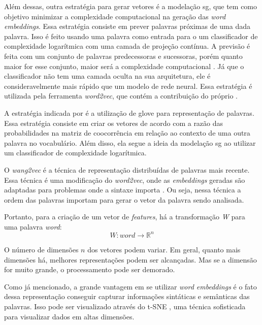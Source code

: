 Além dessas, outra estratégia para gerar vetores é a modelação \ac{sg}, que tem como objetivo minimizar a complexidade computacional na geração das \textit{word embeddings}. Essa estratégia consiste em prever palavras próximas de uma dada palavra. Isso é feito usando uma palavra como entrada para o um classificador de complexidade logarítmica com uma camada de projeção contínua. A previsão é feita com um conjunto de palavras predecessoras e sucessoras, porém quanto maior for esse conjunto, maior será a complexidade computacional \cite{mikolov2013efficient}. Já que o classificador não tem uma camada oculta na sua arquitetura, ele é consideravelmente mais rápido que um modelo de rede neural. Essa estratégia é utilizada pela ferramenta \textit{word2vec}, que contém a contribuição do próprio .

A estratégia indicada por  é a utilização de \ac{glove} para representação de palavras. Essa estratégia consiste em criar os vetores de acordo com a razão das probabilidades na matriz de coocorrência em relação ao contexto de uma outra palavra no vocabulário. Além disso, ela segue a ideia da modelação \ac{sg} ao utilizar um classificador de complexidade logarítmica. 

O \textit{wang2vec} é a técnica de representação distribuídas de palavras mais recente. Essa técnica é uma modificação do \textit{word2vec}, onde as \textit{embeddings} geradas são adaptadas para problemas onde a sintaxe importa \cite{blacktwo}. Ou seja, nessa técnica a ordem das palavras importam para gerar o vetor da palavra sendo analisada.

Portanto, para a criação de um vetor de \textit{features}, há a transformação \textit{W} para uma palavra \textit{word}:
\begin{equation}
W:word \to \mathbb{R}^n \nonumber
\end{equation}

O número de dimensões $n$ dos vetores podem variar. Em geral, quanto mais dimensões há, melhores representações podem ser alcançadas. Mas se a dimensão for muito grande, o processamento pode ser demorado.

Como já mencionado, a grande vantagem em se utilizar \textit{word embeddings} é o fato dessa representação conseguir capturar informações sintáticas e semânticas das palavras. Isso pode ser visualizado através do t-SNE \cite{van2008visualizing}, uma técnica sofisticada para visualizar dados em altas dimensões.


